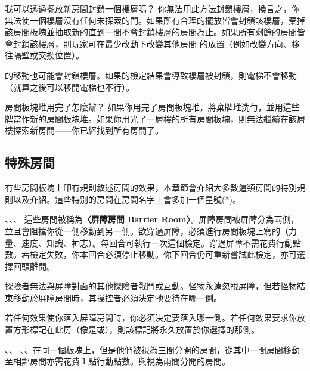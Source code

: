 \begin{RuleBox}{我可以透過擺放新房間封鎖一個樓層嗎？}%
  你無法用此方法封鎖樓層，換言之，你無法使一個樓層沒有任何未探索的門。如果所有合理的擺放皆會封鎖該樓層，棄掉該房間板塊並抽取新的直到一間不會封鎖樓層的房間為止。如果所有剩餘的房間皆會封鎖該樓層，則玩家可在最少改動下改變其他房間 的放置（例如改變方向、移往隔壁或交換位置）。\par
  的移動也可能會封鎖樓層。如果的檢定結果會導致樓層被封鎖，則電梯不會移動（就算之後可以移開電梯也不行）。
\end{RuleBox}

\begin{RuleBox}{房間板塊堆用完了怎麼辦？}%
  如果你用完了房間板塊堆，將棄牌堆洗勻，並用這些牌當作新的房間板塊堆。如果你用光了一層樓的所有房間板塊，則無法繼續在該層樓探索新房間——你已經找到所有房間了。
\end{RuleBox}

\subsection{特殊房間} \label{ssec:special-room}
有些房間板塊上印有規則敘述房間的效果，本章節會介紹大多數這類房間的特別規則以及介紹。這些特別的房間在房間名字上會多加一個星號(*)。

\begin{RuleBox}{、、、}%
  這些房間被稱為\textbf{〈屏障房間 Barrier Room〉}。屏障房間被屏障分為兩側，並且會阻擋你從一側移動到另一側。欲穿過屏障，必須進行房間板塊上寫的\textbf{}（力量、速度、知識、神志）。每回合可執行一次這個檢定。穿過屏障不需花費行動點數。若檢定失敗，你本回合必須停止移動。你下回合仍可重新嘗試此檢定，亦可選擇回頭離開。\par
  探險者無法與屏障對面的其他探險者戰鬥或互動。怪物永遠忽視屏障，但若怪物結束移動於屏障房間時，其操控者必須決定牠要待在哪一側。\par
  若任何效果使你落入屏障房間時，你必須決定要落入哪一側。若任何效果要求你放置方形標記在此房（像是或），則該標記將永久放置於你選擇的那側。
\end{RuleBox}

\begin{RuleBox}{、、}%
  、、在同一個板塊上，但是他們被視為三間分開的房間，從其中一間房間移動至相鄰房間亦需花費１點行動點數。與視為兩間分開的房間。
\end{RuleBox}

